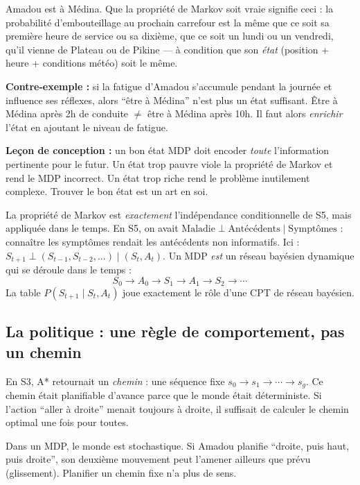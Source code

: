 \documentclass[11pt,a4paper]{article}
\begin{document}
\begin{exemplebox}
Amadou est à Médina. Que la propriété de Markov soit vraie signifie ceci : la probabilité d'embouteillage au prochain carrefour est la même que ce soit sa première heure de service ou sa dixième, que ce soit un lundi ou un vendredi, qu'il vienne de Plateau ou de Pikine --- à condition que son \textit{état} (position + heure + conditions météo) soit le même.

\textbf{Contre-exemple :} si la fatigue d'Amadou s'accumule pendant la journée et influence ses réflexes, alors ``être à Médina'' n'est plus un état suffisant. Être à Médina après 2h de conduite $\neq$ être à Médina après 10h. Il faut alors \textit{enrichir} l'état en ajoutant le niveau de fatigue.

\textbf{Leçon de conception :} un bon état MDP doit encoder \textit{toute} l'information pertinente pour le futur. Un état trop pauvre viole la propriété de Markov et rend le MDP incorrect. Un état trop riche rend le problème inutilement complexe. Trouver le bon état est un art en soi.
\end{exemplebox}

\begin{attentionbox}
La propriété de Markov est \textit{exactement} l'indépendance conditionnelle de S5, mais appliquée dans le temps. En S5, on avait $\text{Maladie} \perp \text{Antécédents} \mid \text{Symptômes}$ : connaître les symptômes rendait les antécédents non informatifs. Ici : $S_{t+1} \perp (S_{t-1}, S_{t-2}, \ldots) \mid (S_t, A_t)$. Un MDP \textit{est} un réseau bayésien dynamique qui se déroule dans le temps :
$$S_0 \to A_0 \to S_1 \to A_1 \to S_2 \to \cdots$$
La table $P(S_{t+1} \mid S_t, A_t)$ joue exactement le rôle d'une CPT de réseau bayésien.
\end{attentionbox}

\subsection{La politique : une règle de comportement, pas un chemin}

En S3, A* retournait un \textit{chemin} : une séquence fixe $s_0 \to s_1 \to \cdots \to s_g$. Ce chemin était planifiable d'avance parce que le monde était déterministe. Si l'action ``aller à droite'' menait toujours à droite, il suffisait de calculer le chemin optimal une fois pour toutes.

Dans un MDP, le monde est stochastique. Si Amadou planifie ``droite, puis haut, puis droite'', son deuxième mouvement peut l'amener ailleurs que prévu (glissement). Planifier un chemin fixe n'a plus de sens.
\end{document}
